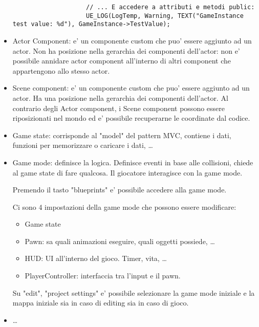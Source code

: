 \begin{itemize}
\begin{verbatim}
                    // ... E accedere a attributi e metodi public:
                    UE_LOG(LogTemp, Warning, TEXT("GameInstance test value: %d"), GameInstance->TestValue);
                \end{verbatim}

            \item Actor Component: e' un componente custom che puo' essere aggiunto ad un actor. Non ha posizione nella gerarchia dei componenti dell'actor: non e' possibile annidare actor component all'interno di altri component che appartengono allo stesso actor.
            \item Scene component: e' un componente custom che puo' essere aggiunto ad un actor. Ha una posizione nella gerarchia dei componenti dell'actor. Al contrario degli Actor component, i Scene component possono essere riposizionati nel mondo ed e' possibile recuperarne le coordinate dal codice.

            \item Game state: corrisponde al "model" del pattern MVC, contiene i dati, funzioni per memorizzare o caricare i dati, \dots
            \item Game mode: definisce la logica. Definisce eventi in base alle collisioni, chiede al game state di fare qualcosa. Il giocatore interagisce con la game mode.

                Premendo il tasto "blueprints" e' possibile accedere alla game mode.

                Ci sono 4 impostazioni della game mode che possono essere modificare:
                \begin{itemize}
                    \item Game state
                    \item Pawn: sa quali animazioni eseguire, quali oggetti possiede, \dots
                    \item HUD: UI all'interno del gioco. Timer, vita, \dots
                    \item PlayerController: interfaccia tra l'input e il pawn.
                \end{itemize}

                Su "edit", "project settings" e' possibile selezionare la game mode iniziale e la mappa iniziale sia in caso di editing sia in caso di gioco.

            \item \dots
        \end{itemize}

